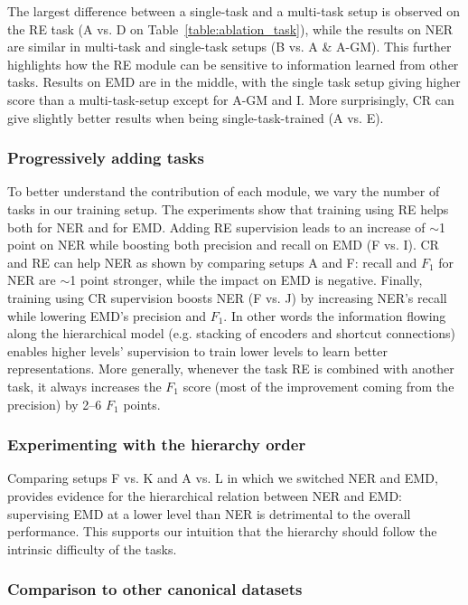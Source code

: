 \documentclass[letterpaper]{article} %
\begin{document}
The largest difference between a single-task and a multi-task setup is observed on the RE task (A vs. D on Table~\ref{table:ablation_task}), while the results on NER are similar in multi-task and single-task setups (B vs. A \& A-GM). This further highlights how the RE module can be sensitive to information learned from other tasks. Results on EMD are in the middle, with the single task setup giving higher score than a multi-task-setup except for A-GM and I. More surprisingly, CR can give slightly better results when being single-task-trained (A vs. E).

\subsubsection*{Progressively adding tasks}

To better understand the contribution of each module, we vary the number of tasks in our training setup. The experiments show that training using RE helps both for NER and for EMD. Adding RE supervision leads to an increase of $\sim$1 point on NER while boosting both precision and recall on EMD (F vs. I). CR and RE can help NER as shown by comparing setups A and F: recall and $F_{1}$ for NER are $\sim$1 point stronger, while the impact on EMD is negative. Finally, training using CR supervision boosts NER (F vs. J) by increasing NER's recall while lowering EMD's precision and $F_{1}$. In other words the information flowing along the hierarchical model (e.g. stacking of encoders and shortcut connections) enables higher levels' supervision to train lower levels to learn better representations. More generally, whenever the task RE is combined with another task, it always increases the $F_{1}$ score (most of the improvement coming from the precision) by 2--6 $F_{1}$ points.

\subsubsection*{Experimenting with the hierarchy order}

Comparing setups F vs. K and A vs. L in which we switched NER and EMD, provides evidence for the hierarchical relation between NER and EMD: supervising EMD at a lower level than NER is detrimental to the overall performance. This supports our intuition that the hierarchy should follow the intrinsic difficulty of the tasks.

\subsubsection*{Comparison to other canonical datasets}
\end{document}
